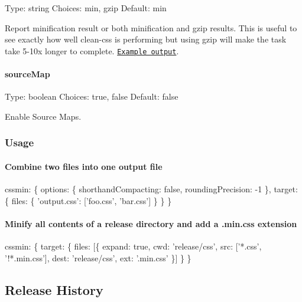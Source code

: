 Type\+: {\ttfamily string} Choices\+: {\ttfamily \textquotesingle{}min\textquotesingle{}}, {\ttfamily \textquotesingle{}gzip\textquotesingle{}} Default\+: {\ttfamily \textquotesingle{}min\textquotesingle{}}

Report minification result or both minification and gzip results. This is useful to see exactly how well clean-\/css is performing but using {\ttfamily \textquotesingle{}gzip\textquotesingle{}} will make the task take 5-\/10x longer to complete. \href{https://github.com/sindresorhus/maxmin#readme}{\tt Example output}.

\paragraph*{source\+Map}

Type\+: {\ttfamily boolean} Choices\+: {\ttfamily true}, {\ttfamily false} Default\+: {\ttfamily false}

Enable Source Maps.

\subsubsection*{Usage}

\paragraph*{Combine two files into one output file}


\begin{DoxyCode}
cssmin: \{
  options: \{
    shorthandCompacting: false,
    roundingPrecision: -1
  \},
  target: \{
    files: \{
      'output.css': ['foo.css', 'bar.css']
    \}
  \}
\}
\end{DoxyCode}


\paragraph*{Minify all contents of a release directory and add a {\ttfamily .min.\+css} extension}


\begin{DoxyCode}
cssmin: \{
  target: \{
    files: [\{
      expand: true,
      cwd: 'release/css',
      src: ['*.css', '!*.min.css'],
      dest: 'release/css',
      ext: '.min.css'
    \}]
  \}
\}
\end{DoxyCode}


\subsection*{Release History}



